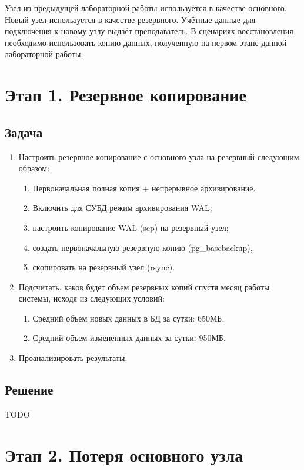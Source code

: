 \documentclass{article}
\begin{document}
Узел из предыдущей лабораторной работы используется в качестве основного. Новый узел используется в качестве резервного. Учётные данные для подключения к новому узлу выдаёт преподаватель. В сценариях восстановления необходимо использовать копию данных, полученную на первом этапе данной лабораторной работы.

\section{Этап 1. Резервное копирование}

\subsection{Задача}

\begin{enumerate}
    \item Настроить резервное копирование с основного узла на резервный следующим образом:
    \begin{enumerate}
        \item Первоначальная полная копия + непрерывное архивирование.
        \item Включить для СУБД режим архивирования WAL;
        \item настроить копирование WAL (scp) на резервный узел;
        \item создать первоначальную резервную копию (pg\_basebackup),
        \item скопировать на резервный узел (rsync).
    \end{enumerate}
    \item Подсчитать, каков будет объем резервных копий спустя месяц работы системы, исходя из следующих условий:
    \begin{enumerate}
        \item Средний объем новых данных в БД за сутки: 650МБ.
        \item Средний объем измененных данных за сутки: 950МБ.
    \end{enumerate}
    \item Проанализировать результаты.
\end{enumerate}

\subsection{Решение}

TODO

\section{Этап 2. Потеря основного узла}
\end{document}

